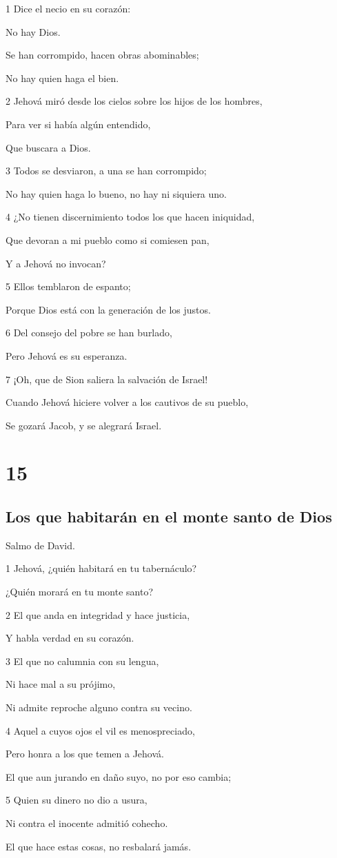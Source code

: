 \par 1 Dice el necio en su corazón:
\par No hay Dios.
\par Se han corrompido, hacen obras abominables;
\par No hay quien haga el bien.
\par 2 Jehová miró desde los cielos sobre los hijos de los hombres,
\par Para ver si había algún entendido,
\par Que buscara a Dios.
\par 3 Todos se desviaron, a una se han corrompido;
\par No hay quien haga lo bueno, no hay ni siquiera uno.
\par 4 ¿No tienen discernimiento todos los que hacen iniquidad,
\par Que devoran a mi pueblo como si comiesen pan,
\par Y a Jehová no invocan?
\par 5 Ellos temblaron de espanto;
\par Porque Dios está con la generación de los justos.
\par 6 Del consejo del pobre se han burlado,
\par Pero Jehová es su esperanza.
\par 7 ¡Oh, que de Sion saliera la salvación de Israel!
\par Cuando Jehová hiciere volver a los cautivos de su pueblo,
\par Se gozará Jacob, y se alegrará Israel.

\chapter{15}

\section*{Los que habitarán en el monte santo de Dios}

\par Salmo de David.

\par 1 Jehová, ¿quién habitará en tu tabernáculo?
\par ¿Quién morará en tu monte santo?
\par 2 El que anda en integridad y hace justicia,
\par Y habla verdad en su corazón.
\par 3 El que no calumnia con su lengua,
\par Ni hace mal a su prójimo,
\par Ni admite reproche alguno contra su vecino.
\par 4 Aquel a cuyos ojos el vil es menospreciado,
\par Pero honra a los que temen a Jehová.
\par El que aun jurando en daño suyo, no por eso cambia;
\par 5 Quien su dinero no dio a usura,
\par Ni contra el inocente admitió cohecho.
\par El que hace estas cosas, no resbalará jamás.

